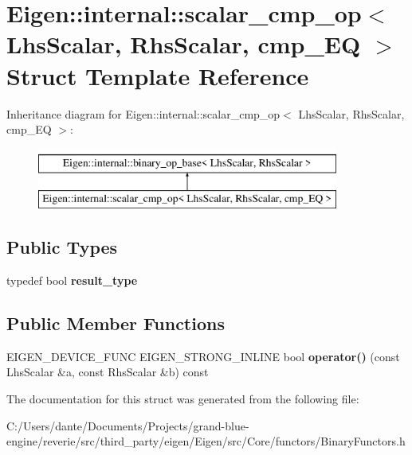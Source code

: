 \hypertarget{struct_eigen_1_1internal_1_1scalar__cmp__op_3_01_lhs_scalar_00_01_rhs_scalar_00_01cmp___e_q_01_4}{}\section{Eigen\+::internal\+::scalar\+\_\+cmp\+\_\+op$<$ Lhs\+Scalar, Rhs\+Scalar, cmp\+\_\+\+EQ $>$ Struct Template Reference}
\label{struct_eigen_1_1internal_1_1scalar__cmp__op_3_01_lhs_scalar_00_01_rhs_scalar_00_01cmp___e_q_01_4}
Inheritance diagram for Eigen\+::internal\+::scalar\+\_\+cmp\+\_\+op$<$ Lhs\+Scalar, Rhs\+Scalar, cmp\+\_\+\+EQ $>$\+:\begin{figure}[H]
\begin{center}
\leavevmode
\includegraphics[height=2.000000cm]{struct_eigen_1_1internal_1_1scalar__cmp__op_3_01_lhs_scalar_00_01_rhs_scalar_00_01cmp___e_q_01_4}
\end{center}
\end{figure}
\subsection*{Public Types}
\begin{DoxyCompactItemize}
\item 
\mbox{\label{struct_eigen_1_1internal_1_1scalar__cmp__op_3_01_lhs_scalar_00_01_rhs_scalar_00_01cmp___e_q_01_4_a07362cb24516864c1d48f66796bbe182}} 
typedef bool {\bfseries result\+\_\+type}
\end{DoxyCompactItemize}
\subsection*{Public Member Functions}
\begin{DoxyCompactItemize}
\item 
\mbox{\label{struct_eigen_1_1internal_1_1scalar__cmp__op_3_01_lhs_scalar_00_01_rhs_scalar_00_01cmp___e_q_01_4_a7f76caed73253aadfd4c6c87941d4740}} 
E\+I\+G\+E\+N\+\_\+\+D\+E\+V\+I\+C\+E\+\_\+\+F\+U\+NC E\+I\+G\+E\+N\+\_\+\+S\+T\+R\+O\+N\+G\+\_\+\+I\+N\+L\+I\+NE bool {\bfseries operator()} (const Lhs\+Scalar \&a, const Rhs\+Scalar \&b) const
\end{DoxyCompactItemize}


The documentation for this struct was generated from the following file\+:\begin{DoxyCompactItemize}
\item 
C\+:/\+Users/dante/\+Documents/\+Projects/grand-\/blue-\/engine/reverie/src/third\+\_\+party/eigen/\+Eigen/src/\+Core/functors/Binary\+Functors.\+h\end{DoxyCompactItemize}
